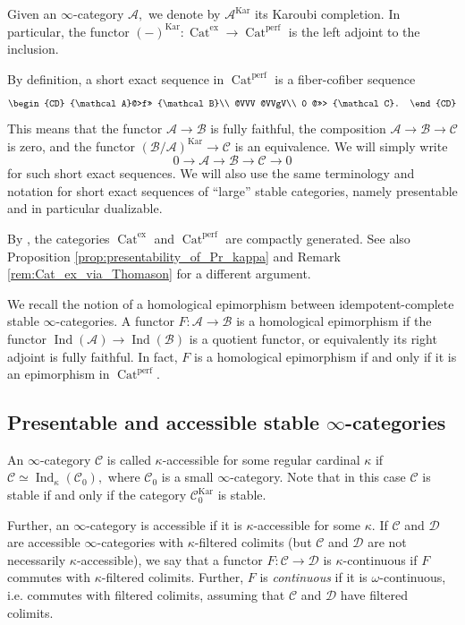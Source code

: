 \documentclass[11pt,leqno]{amsart}
\numberwithin{equation}{section}
\newcommand{\Cat}{\operatorname{Cat}}
\newcommand{\ex}{\operatorname{ex}}
\newcommand{\cD}{{\mathcal D}}
\newcommand{\cA}{{\mathcal A}}
\newcommand{\cB}{{\mathcal B}}
\newcommand{\cC}{{\mathcal C}}
\newcommand{\perf}{\operatorname{perf}}
\newcommand{\Kar}{\operatorname{Kar}}
\newcommand{\Ind}{\operatorname{Ind}}
\begin{document}
Given an $\infty$-category $\cA,$ we denote by $\cA^{\Kar}$ its Karoubi completion. In particular, the functor $(-)^{\Kar}:\Cat^{\ex}\to\Cat^{\perf}$ is the left adjoint to the inclusion.

By definition, a short exact sequence in $\Cat^{\perf}$ is a fiber-cofiber sequence
$$
\begin{CD}
\cA @>f>> \cB\\
@VVV @VVgV\\
0 @>>> \cC.
\end{CD}
$$
This means that the functor $\cA\to\cB$ is fully faithful, the composition $\cA\to\cB\to\cC$ is zero, and the functor $(\cB/\cA)^{\Kar}\to\cC$ is an equivalence. We will simply write
$$0\to\cA\to\cB\to\cC\to 0$$
for such short exact sequences. We will also use the same terminology and notation for short exact sequences of ``large'' stable categories, namely presentable and in particular dualizable.

By \cite[Corollary 4.25]{BGT}, the categories $\Cat^{\ex}$ and $\Cat^{\perf}$ are compactly generated. See also Proposition \ref{prop:presentability_of_Pr_kappa} and Remark \ref{rem:Cat_ex_via_Thomason} for a different argument.

We recall the notion of a homological epimorphism between idempotent-complete stable $\infty$-categories. A functor $F:\cA\to\cB$ is a homological epimorphism if the functor $\Ind(\cA)\to\Ind(\cB)$ is a quotient functor, or equivalently its right adjoint is fully faithful. In fact, $F$ is a homological epimorphism if and only if it is an epimorphism in $\Cat^{\perf}.$ 

\subsection{Presentable and accessible stable $\infty$-categories}
\label{ssec:pres_acc_cats}

An $\infty$-category $\cC$ is called $\kappa$-accessible for some regular cardinal $\kappa$ if $\cC\simeq\Ind_{\kappa}(\cC_0),$ where $\cC_0$ is a small $\infty$-category. Note that in this case $\cC$ is stable if and only if the category $\cC_0^{\Kar}$ is stable. 

Further, an $\infty$-category is accessible if it is $\kappa$-accessible for some $\kappa.$ If $\cC$ and $\cD$ are accessible $\infty$-categories with $\kappa$-filtered colimits (but $\cC$ and $\cD$ are not necessarily $\kappa$-accessible), we say that a functor $F:\cC\to\cD$ is $\kappa$-continuous if $F$ commutes with $\kappa$-filtered colimits. Further, $F$ is {\it continuous} if it is $\omega$-continuous, i.e. commutes with filtered colimits, assuming that $\cC$ and $\cD$ have filtered colimits.
\end{document}
